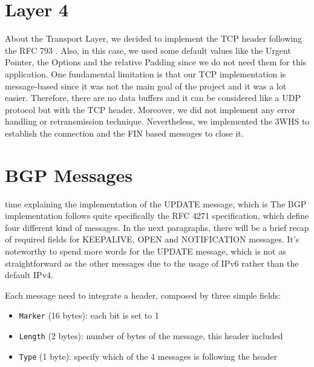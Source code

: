 \section{Layer 4}\label{layer4}
About the Transport Layer, we decided to implement the TCP header following the RFC 793 \cite{rfc793}.
Also, in this case, we used some default values like the Urgent Pointer, the Options and the relative Padding since we do not need them for this application.\newline
One fundamental limitation is that our TCP implementation is message-based since it was not the main goal of the project and it was a lot easier.
Therefore, there are no data buffers and it can be considered like a UDP protocol but with the TCP header.
Moreover, we did not implement any error handling or retransmission technique.\newline
Nevertheless, we implemented the 3WHS to establish the connection and the FIN based messages to close it.

\section{BGP Messages}\label{BGPMex}
time explaining the implementation of the UPDATE message, which is The BGP implementation follows quite specifically the RFC 4271 specification, which define four different kind of messages.
In the next paragraphs, there will be a brief recap of required fields for KEEPALIVE, OPEN and NOTIFICATION messages. It's noteworthy to spend more words for the UPDATE message, which is not as straightforward as the other messages due to the usage of IPv6 rather than the default IPv4.

Each message need to integrate a header, composed by three simple fields:
\begin{itemize}
    \item \texttt{Marker} (16 bytes): each bit is set to 1
    \item \texttt{Length} (2 bytes): number of bytes of the message, this header included
    \item \texttt{Type} (1 byte): specify which of the 4 messages is following the header
\end{itemize}

